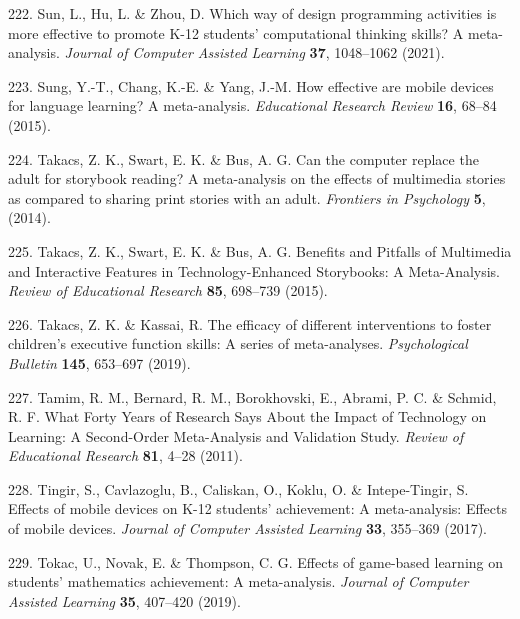 \documentclass[
  english,
  man]{apa6}
\newenvironment{cslreferences}%
  {}%
  {\par}
\begin{document}
\begin{cslreferences}
\leavevmode\hypertarget{ref-sunWhichWayDesign2021}{}%
222. Sun, L., Hu, L. \& Zhou, D. Which way of design programming activities is more effective to promote K-12 students' computational thinking skills? A meta-analysis. \emph{Journal of Computer Assisted Learning} \textbf{37}, 1048--1062 (2021).

\leavevmode\hypertarget{ref-sungHowEffectiveAre2015}{}%
223. Sung, Y.-T., Chang, K.-E. \& Yang, J.-M. How effective are mobile devices for language learning? A meta-analysis. \emph{Educational Research Review} \textbf{16}, 68--84 (2015).

\leavevmode\hypertarget{ref-takacsCanComputerReplace2014}{}%
224. Takacs, Z. K., Swart, E. K. \& Bus, A. G. Can the computer replace the adult for storybook reading? A meta-analysis on the effects of multimedia stories as compared to sharing print stories with an adult. \emph{Frontiers in Psychology} \textbf{5}, (2014).

\leavevmode\hypertarget{ref-takacsBenefitsPitfallsMultimedia2015}{}%
225. Takacs, Z. K., Swart, E. K. \& Bus, A. G. Benefits and Pitfalls of Multimedia and Interactive Features in Technology-Enhanced Storybooks: A Meta-Analysis. \emph{Review of Educational Research} \textbf{85}, 698--739 (2015).

\leavevmode\hypertarget{ref-takacsEfficacyDifferentInterventions2019}{}%
226. Takacs, Z. K. \& Kassai, R. The efficacy of different interventions to foster children's executive function skills: A series of meta-analyses. \emph{Psychological Bulletin} \textbf{145}, 653--697 (2019).

\leavevmode\hypertarget{ref-tamimWhatFortyYears2011}{}%
227. Tamim, R. M., Bernard, R. M., Borokhovski, E., Abrami, P. C. \& Schmid, R. F. What Forty Years of Research Says About the Impact of Technology on Learning: A Second-Order Meta-Analysis and Validation Study. \emph{Review of Educational Research} \textbf{81}, 4--28 (2011).

\leavevmode\hypertarget{ref-tingirEffectsMobileDevices2017}{}%
228. Tingir, S., Cavlazoglu, B., Caliskan, O., Koklu, O. \& Intepe-Tingir, S. Effects of mobile devices on K-12 students' achievement: A meta-analysis: Effects of mobile devices. \emph{Journal of Computer Assisted Learning} \textbf{33}, 355--369 (2017).

\leavevmode\hypertarget{ref-tokacEffectsGamebasedLearning2019}{}%
229. Tokac, U., Novak, E. \& Thompson, C. G. Effects of game-based learning on students' mathematics achievement: A meta-analysis. \emph{Journal of Computer Assisted Learning} \textbf{35}, 407--420 (2019).


\end{cslreferences}
\end{document}
